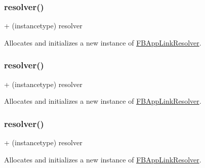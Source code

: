 \subsubsection{\texorpdfstring{resolver()}{resolver()}\hspace{0.1cm}{\footnotesize\ttfamily [2/5]}}
{\footnotesize\ttfamily + (instancetype) resolver \begin{DoxyParamCaption}{ }\end{DoxyParamCaption}}

Allocates and initializes a new instance of \hyperlink{interfaceFBAppLinkResolver}{F\+B\+App\+Link\+Resolver}. \mbox{\label{interfaceFBAppLinkResolver_a2012888799cc3416e4c6d01e1a18f90b}} 
\subsubsection{\texorpdfstring{resolver()}{resolver()}\hspace{0.1cm}{\footnotesize\ttfamily [3/5]}}
{\footnotesize\ttfamily + (instancetype) resolver \begin{DoxyParamCaption}{ }\end{DoxyParamCaption}}

Allocates and initializes a new instance of \hyperlink{interfaceFBAppLinkResolver}{F\+B\+App\+Link\+Resolver}. \mbox{\label{interfaceFBAppLinkResolver_a2012888799cc3416e4c6d01e1a18f90b}} 
\subsubsection{\texorpdfstring{resolver()}{resolver()}\hspace{0.1cm}{\footnotesize\ttfamily [4/5]}}
{\footnotesize\ttfamily + (instancetype) resolver \begin{DoxyParamCaption}{ }\end{DoxyParamCaption}}

Allocates and initializes a new instance of \hyperlink{interfaceFBAppLinkResolver}{F\+B\+App\+Link\+Resolver}. \mbox{\label{interfaceFBAppLinkResolver_a2012888799cc3416e4c6d01e1a18f90b}} 
